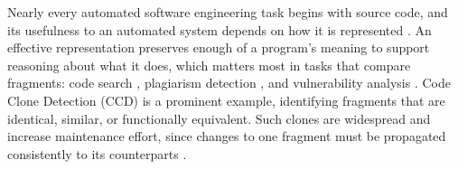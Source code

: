\documentclass[final,5p,times,twocolumn]{elsarticle}
\newcommand{\method}{\textsc{SPECTRA-Siam}}
\newcommand{\added}[1]{{\color{green!50!black}#1}}
\theoremstyle{plain}
\begin{document}

Nearly every automated software engineering task begins with source code, and its usefulness to an automated system depends on how it is represented \cite{allamanis2018survey}. An effective representation preserves enough of a program's meaning to support reasoning about what it does, which matters most in tasks that compare fragments: code search \cite{gu2018deepcs}, plagiarism detection \cite{schleimer2003winnowing}, and vulnerability analysis \cite{zhou2019devign}. Code Clone Detection (CCD) is a prominent example, identifying fragments that are identical, similar, or functionally equivalent. Such clones are widespread and increase maintenance effort, since changes to one fragment must be propagated consistently to its counterparts \cite{juergens2009clones,roy2007survey}.
\end{document}
